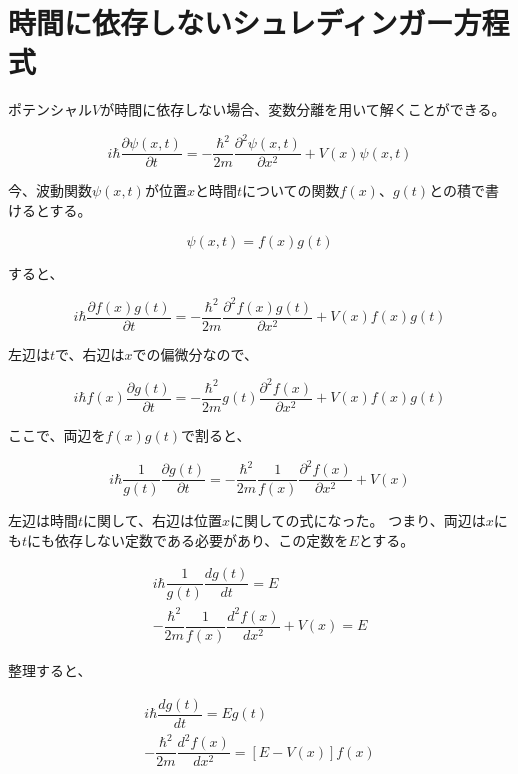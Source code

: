 \section{時間に依存しないシュレディンガー方程式}
ポテンシャル$V$が時間に依存しない場合、変数分離を用いて解くことができる。

\begin{equation}
  i\hbar \dfrac{\partial \psi(x,t)}{\partial t} = - \dfrac{\hbar^2}{2m} \dfrac{\partial^2 \psi(x,t)}{\partial x^2} + V(x)\psi(x,t)
\end{equation}

今、波動関数$\psi(x,t)$が位置$x$と時間$t$についての関数$f(x)$、$g(t)$との積で書けるとする。

\begin{equation}
  \psi(x,t) = f(x)g(t)
\end{equation}

すると、

\begin{equation}
  i\hbar \dfrac{\partial f(x)g(t)}{\partial t} = - \dfrac{\hbar^2}{2m} \dfrac{\partial^2 f(x)g(t)}{\partial x^2} + V(x)f(x)g(t)
\end{equation}

左辺は$t$で、右辺は$x$での偏微分なので、

\begin{equation}
  i\hbar f(x)\dfrac{\partial g(t)}{\partial t} = - \dfrac{\hbar^2}{2m} g(t)\dfrac{\partial^2 f(x)}{\partial x^2} + V(x)f(x)g(t)
\end{equation}

ここで、両辺を$f(x)g(t)$で割ると、

\begin{equation}
  i\hbar \dfrac{1}{g(t)}\dfrac{\partial g(t)}{\partial t} = - \dfrac{\hbar^2}{2m} \dfrac{1}{f(x)}\dfrac{\partial^2 f(x)}{\partial x^2} + V(x)
\end{equation}

左辺は時間$t$に関して、右辺は位置$x$に関しての式になった。
つまり、両辺は$x$にも$t$にも依存しない定数である必要があり、この定数を$E$とする。

\begin{align}
  i\hbar \dfrac{1}{g(t)}\dfrac{d g(t)}{d t} = E \\
  - \dfrac{\hbar^2}{2m} \dfrac{1}{f(x)}\dfrac{d^2 f(x)}{d x^2} + V(x) = E
\end{align}

整理すると、

\begin{align}
  \label{eq.no.1}
  i\hbar \dfrac{d g(t)}{d t} = Eg(t) \\
  \label{eq.no.2}
  - \dfrac{\hbar^2}{2m} \dfrac{d^2 f(x)}{d x^2} = [ E-V(x) ]f(x)
\end{align}

